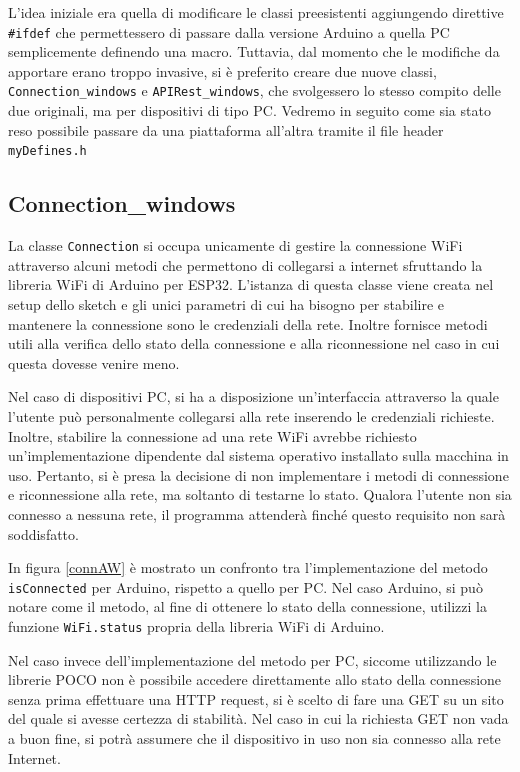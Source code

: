 L’idea iniziale era quella di modificare le classi preesistenti aggiungendo direttive \texttt{\#ifdef} che permettessero di passare dalla versione Arduino a quella PC semplicemente definendo una macro. Tuttavia, dal momento che le modifiche da apportare erano troppo invasive, si è preferito creare due nuove classi, \texttt{Connection\_windows} e \texttt{APIRest\_windows}, che svolgessero lo stesso compito delle due originali, ma per dispositivi di tipo PC. Vedremo in seguito come sia stato reso possibile passare da una piattaforma all'altra tramite il file header \texttt{myDefines.h} 
\subsection{Connection\_windows}
La classe \texttt{Connection} si occupa unicamente di gestire la connessione WiFi attraverso alcuni metodi che permettono di collegarsi a internet sfruttando la libreria WiFi di Arduino per ESP32. L'istanza di questa classe viene creata nel setup dello sketch e gli unici parametri di cui ha bisogno per stabilire e mantenere la connessione sono le credenziali della rete. Inoltre fornisce metodi utili alla verifica dello stato della connessione e alla riconnessione nel caso in cui questa dovesse venire meno.

Nel caso di dispositivi PC, si ha a disposizione un’interfaccia attraverso la quale l’utente può personalmente collegarsi alla rete inserendo le credenziali richieste. Inoltre, stabilire la connessione ad una rete WiFi avrebbe richiesto un’implementazione dipendente dal sistema operativo installato sulla macchina in uso. Pertanto, si è presa la decisione di non implementare i metodi di connessione e riconnessione alla rete, ma soltanto di testarne lo stato. Qualora l’utente non sia connesso a nessuna rete, il programma attenderà finché questo requisito non sarà soddisfatto.

In figura \ref{connAW} è mostrato un confronto tra l’implementazione del metodo \texttt{isConnected} per Arduino, rispetto a quello per PC. Nel caso Arduino, si può notare come il metodo, al fine di ottenere lo stato della connessione, utilizzi la funzione \texttt{WiFi.status} propria della libreria WiFi di Arduino.

Nel caso invece dell'implementazione del metodo per PC, siccome utilizzando le librerie POCO non è possibile accedere direttamente allo stato della connessione senza prima effettuare una HTTP request, si è scelto di fare una GET su un sito del quale si avesse certezza di stabilità. Nel caso in cui la richiesta GET non vada a buon fine, si potrà assumere che il dispositivo in uso non sia connesso alla rete Internet.


